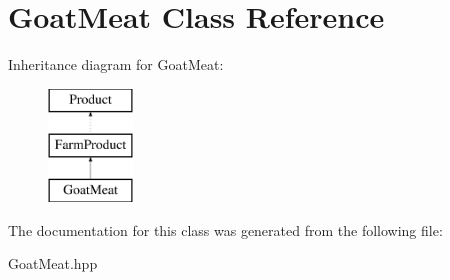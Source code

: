 \hypertarget{class_goat_meat}{}\section{Goat\+Meat Class Reference}
\label{class_goat_meat}
Inheritance diagram for Goat\+Meat\+:\begin{figure}[H]
\begin{center}
\leavevmode
\includegraphics[height=3.000000cm]{class_goat_meat}
\end{center}
\end{figure}


The documentation for this class was generated from the following file\+:\begin{DoxyCompactItemize}
\item 
Goat\+Meat.\+hpp\end{DoxyCompactItemize}

